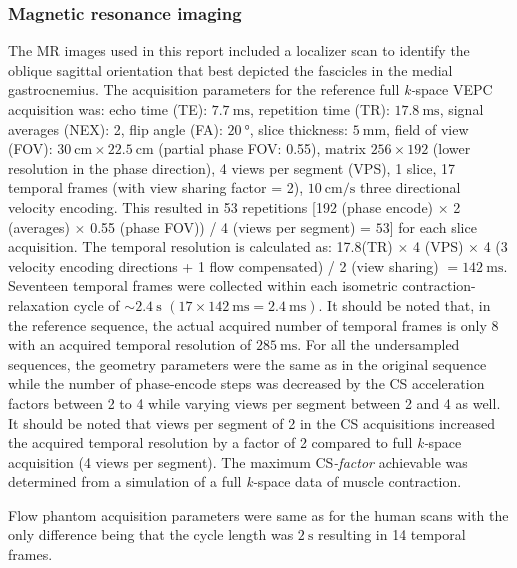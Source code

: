 \subsubsection{Magnetic resonance imaging}
The MR images used in this report included a localizer scan to identify the oblique sagittal orientation that best depicted the fascicles in the medial gastrocnemius. 
The acquisition parameters for the reference full \mbox{\textit{k-}space} VEPC acquisition was: echo time (TE): $\SI{7.7}{\milli\second}$, repetition time (TR): $\SI{17.8}{\milli\second}$, signal averages (NEX): 2, flip angle (FA): $\SI{20}{\degree}$, slice thickness: $\SI{5}{\milli\meter}$, field of view (FOV): $\SI{30}{\centi\meter} \times \SI{22.5}{\centi\meter}$ (partial phase FOV: 0.55), matrix $256 \times 192$ (lower resolution in the phase direction), 4 views per segment (VPS), 1 slice, 17 temporal frames (with view sharing factor = 2), $\SI{10}{\centi\meter/\second}$ three directional velocity encoding. 
This resulted in 53 repetitions [192 (phase encode) $\times$ 2 (averages) $\times$ 0.55 (phase FOV)) / 4 (views per segment) = $53$] for each slice acquisition. 
The temporal resolution is calculated as: 17.8(TR) $\times$ 4 (VPS) $\times$ 4 (3 velocity encoding directions + 1 flow compensated) / 2 (view sharing) $ = \SI{142}{\milli\second}$. 
Seventeen temporal frames were collected within each isometric contraction-relaxation cycle of $\sim \SI{2.4}{\second}$ $(17 \times \SI{142}{\milli\second}  = \SI{2.4}{\milli\second})$. 
It should be noted that, in the reference sequence, the actual acquired number of temporal frames is only 8 with an acquired temporal resolution of $\SI{285}{\milli\second}$. 
For all the undersampled sequences, the geometry parameters were the same as in the original sequence while the number of phase-encode steps was decreased by the CS acceleration factors between 2 to 4 while varying views per segment between 2 and 4 as well. 
It should be noted that views per segment of 2 in the CS acquisitions increased the acquired temporal resolution by a factor of 2 compared to full \mbox{\textit{k-}space} acquisition (4 views per segment). 
The maximum \mbox{CS\textit{-factor}} achievable was determined from a simulation of a full \mbox{\textit{k-}space} data of muscle contraction. 

Flow phantom acquisition parameters were same as for the human scans with the only difference being that the cycle length was $\SI{2}{\second}$ resulting in 14 temporal frames.
